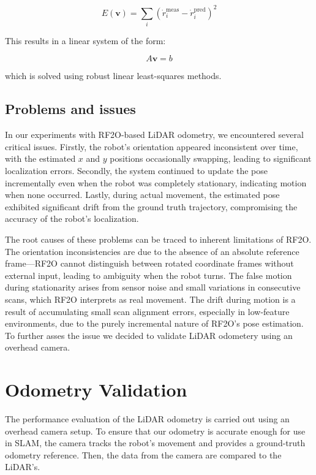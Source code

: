 \[
E(\mathbf{v}) = \sum_i \left( \dot{r}_i^{\text{meas}} - \dot{r}_i^{\text{pred}} \right)^2
\]

This results in a linear system of the form:

\[
A \mathbf{v} = b
\]

which is solved using robust linear least-squares methods.

\subsection*{Problems and issues}
In our experiments with RF2O-based LiDAR odometry, we encountered several critical issues. Firstly, the robot's orientation appeared inconsistent over time, with the estimated $x$ and $y$ positions occasionally swapping, leading to significant localization errors. Secondly, the system continued to update the pose incrementally even when the robot was completely stationary, indicating motion when none occurred. Lastly, during actual movement, the estimated pose exhibited significant drift from the ground truth trajectory, compromising the accuracy of the robot's localization.

The root causes of these problems can be traced to inherent limitations of RF2O. The orientation inconsistencies are due to the absence of an absolute reference frame—RF2O cannot distinguish between rotated coordinate frames without external input, leading to ambiguity when the robot turns. The false motion during stationarity arises from sensor noise and small variations in consecutive scans, which RF2O interprets as real movement. The drift during motion is a result of accumulating small scan alignment errors, especially in low-feature environments, due to the purely incremental nature of RF2O's pose estimation. To further asses the issue we decided to validate LiDAR odometery using an overhead camera.
\section*{Odometry Validation}
\quad The performance evaluation of the LiDAR odometry is carried out using an overhead camera setup. To ensure that our odometry is accurate enough for use in SLAM, the camera tracks the robot’s movement and provides a ground-truth odometry reference. Then, the data from the camera are compared to the LiDAR's.

